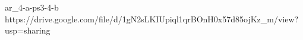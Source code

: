 ar_4-a-ps3-4-b\\
https://drive.google.com/file/d/1gN2sLKIUpiql1qrBOnH0x57d85ojKz_m/view?usp=sharing\\

